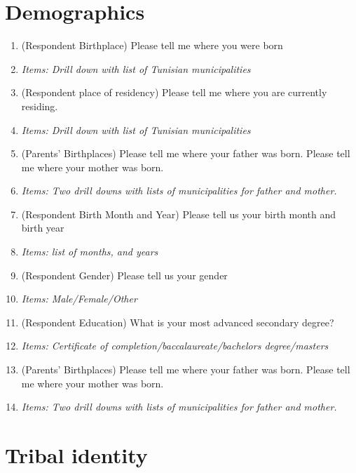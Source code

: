 \documentclass[12pt]{article}
\newcommand{\alerta}[1]{\textcolor{harvardcrimson}{#1}}
\begin{document}
\section*{Demographics}
\begin{enumerate}

\item \alerta{(Respondent Birthplace)} Please tell me where you were born 
    \item[] \textit{Items: Drill down with list of Tunisian municipalities}
    
       \item \alerta{(Respondent place of residency)}  Please tell me where you are currently residing.
    \item[] \textit{Items: Drill down with list of Tunisian municipalities}
    
    \item \alerta{(Parents' Birthplaces)}  Please tell me where your father was born. Please tell me where your mother was born.
    \item[] \textit{Items: Two drill downs with lists of municipalities for father and mother.}
    
    \item \alerta{(Respondent Birth Month and Year)}  Please tell us your birth month and birth year
    \item[] \textit{Items: list of months, and years}
    
     \item \alerta{(Respondent Gender)}  Please tell us your gender
    \item[] \textit{Items: Male/Female/Other}
    
    
     \item \alerta{(Respondent Education)} What is your most advanced secondary degree?
    \item[] \textit{Items: Certificate of completion/baccalaureate/bachelors degree/masters}
    
     \item \alerta{(Parents' Birthplaces)}  Please tell me where your father was born. Please tell me where your mother was born.
    \item[] \textit{Items: Two drill downs with lists of municipalities for father and mother.}
    

\end{enumerate}

\section*{Tribal identity}
\end{document}
